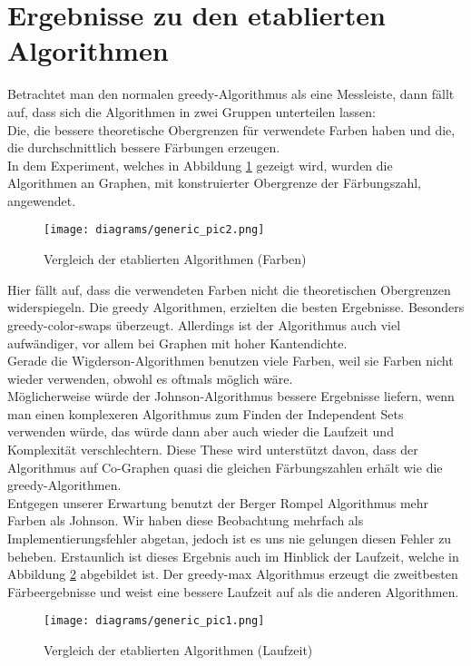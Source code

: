 \documentclass[11pt]{article}
\begin{document}
\section{Ergebnisse zu den etablierten Algorithmen}

Betrachtet man den normalen greedy-Algorithmus als eine Messleiste, dann fällt auf, dass sich die Algorithmen in zwei Gruppen unterteilen lassen: \\
Die, die bessere theoretische Obergrenzen für verwendete Farben haben und die, die durchschnittlich bessere Färbungen erzeugen.\\
In dem Experiment, welches in Abbildung \ref{fig:generic2} gezeigt wird, wurden die Algorithmen an Graphen, mit konstruierter Obergrenze der Färbungszahl, angewendet. 
\begin{figure}
  \texttt{[image: diagrams/generic\_pic2.png]}
  \caption{Vergleich der etablierten Algorithmen (Farben)}
  \label{fig:generic2}
\end{figure}
Hier fällt auf, dass die verwendeten Farben nicht die theoretischen Obergrenzen widerspiegeln. Die greedy Algorithmen, erzielten die besten Ergebnisse. Besonders greedy-color-swaps überzeugt.
Allerdings ist der Algorithmus auch viel aufwändiger, vor allem bei Graphen mit hoher Kantendichte. \\
Gerade die Wigderson-Algorithmen benutzen viele Farben, weil sie Farben nicht wieder verwenden, obwohl es oftmals möglich wäre. \\
Möglicherweise würde der Johnson-Algorithmus bessere Ergebnisse liefern, wenn man einen komplexeren Algorithmus zum Finden der Independent Sets verwenden würde,
das würde dann aber auch wieder die Laufzeit und Komplexität verschlechtern. Diese These wird unterstützt davon, dass der Algorithmus auf Co-Graphen quasi die gleichen Färbungszahlen erhält wie die greedy-Algorithmen.\\
Entgegen unserer Erwartung benutzt der Berger Rompel Algorithmus mehr Farben als Johnson. Wir haben diese Beobachtung mehrfach als Implementierungsfehler abgetan, jedoch ist es uns nie gelungen diesen Fehler zu beheben.
Erstaunlich ist dieses Ergebnis auch im Hinblick der Laufzeit, welche in Abbildung \ref{fig:generic1} abgebildet ist.
Der greedy-max Algorithmus erzeugt die zweitbesten Färbeergebnisse und weist eine bessere Laufzeit auf als die anderen Algorithmen.
\begin{figure}
  \texttt{[image: diagrams/generic\_pic1.png]}
  \caption{Vergleich der etablierten Algorithmen (Laufzeit)}
  \label{fig:generic1}
\end{figure}
\end{document}
